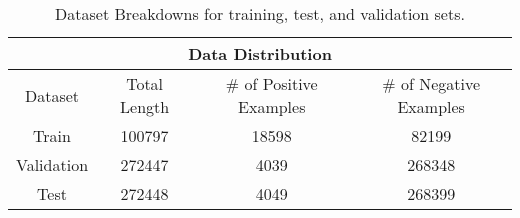 \begin{table}[h]
\centering
\begin{tabular}{|c|c|c|c|}
\hline
\multicolumn{4}{|c|}{Data Distribution} \\
\hline
Dataset & Total Length & $\#$ of Positive Examples & $\#$ of Negative Examples\\
\hline
Train & 100797 & 18598 & 82199 \\
Validation & 272447 & 4039 & 268348 \\
Test & 272448 & 4049 & 268399 \\
\hline
\end{tabular}
\caption{Dataset Breakdowns for training, test, and validation sets.}
\label{tab:data-breakdown}
\end{table}